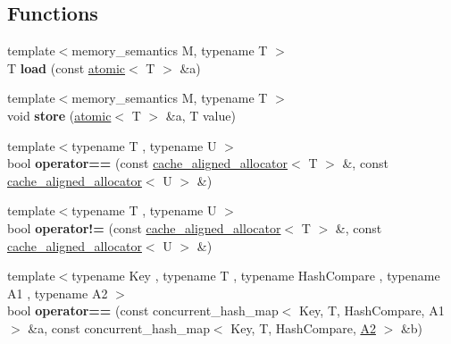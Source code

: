 \subsection*{Functions}
\begin{DoxyCompactItemize}
\item 
\hypertarget{namespacetbb_aed82c77b389b208a1c27012a2fc0b5fd}{}{\footnotesize template$<$memory\+\_\+semantics M, typename T $>$ }\\T {\bfseries load} (const \hyperlink{structtbb_1_1atomic}{atomic}$<$ T $>$ \&a)\label{namespacetbb_aed82c77b389b208a1c27012a2fc0b5fd}

\item 
\hypertarget{namespacetbb_a219b97248f55c909aa3d84e43934b105}{}{\footnotesize template$<$memory\+\_\+semantics M, typename T $>$ }\\void {\bfseries store} (\hyperlink{structtbb_1_1atomic}{atomic}$<$ T $>$ \&a, T value)\label{namespacetbb_a219b97248f55c909aa3d84e43934b105}

\item 
\hypertarget{namespacetbb_a49a6826cf4fb8845d26d8d1f1ad0b5fa}{}{\footnotesize template$<$typename T , typename U $>$ }\\bool {\bfseries operator==} (const \hyperlink{classtbb_1_1cache__aligned__allocator}{cache\+\_\+aligned\+\_\+allocator}$<$ T $>$ \&, const \hyperlink{classtbb_1_1cache__aligned__allocator}{cache\+\_\+aligned\+\_\+allocator}$<$ U $>$ \&)\label{namespacetbb_a49a6826cf4fb8845d26d8d1f1ad0b5fa}

\item 
\hypertarget{namespacetbb_afdaaf3f3248efc804c6f6fe35855704d}{}{\footnotesize template$<$typename T , typename U $>$ }\\bool {\bfseries operator!=} (const \hyperlink{classtbb_1_1cache__aligned__allocator}{cache\+\_\+aligned\+\_\+allocator}$<$ T $>$ \&, const \hyperlink{classtbb_1_1cache__aligned__allocator}{cache\+\_\+aligned\+\_\+allocator}$<$ U $>$ \&)\label{namespacetbb_afdaaf3f3248efc804c6f6fe35855704d}

\item 
\hypertarget{namespacetbb_a1db9470dd2871cb7394ab262dca2051a}{}{\footnotesize template$<$typename Key , typename T , typename Hash\+Compare , typename A1 , typename A2 $>$ }\\bool {\bfseries operator==} (const concurrent\+\_\+hash\+\_\+map$<$ Key, T, Hash\+Compare, A1 $>$ \&a, const concurrent\+\_\+hash\+\_\+map$<$ Key, T, Hash\+Compare, \hyperlink{classA2}{A2} $>$ \&b)\label{namespacetbb_a1db9470dd2871cb7394ab262dca2051a}


\end{DoxyCompactItemize}
